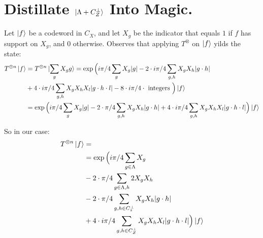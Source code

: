 \documentclass[manuscript,screen,review]{acmart}
\begin{document}
    \section{Distillate $\ket{\Lambda + C_{Z}^{\perp}}$ Into Magic.}
Let $\ket{f}$ be a codeword in $C_{X}$, and let $X_{g}$ be the indicator that equals $1$ if $f$ has support on $X_{g}$, and $0$ otherwise. Observes that applying $T^{\otimes}$ on $\ket{f}$ yilds the state: 
\begin{equation*}
  \begin{split}
    T^{\otimes n}\ket{f} & =  T^{\otimes n}\ket{\sum_{g} X_{g}g } = \exp \Big( i\pi/4 \sum_{g} X_{g}|g|  -  2 \cdot i \pi/4 \sum_{g,h} X_{g}X_{h}|g\cdot h| \\
    & +  4 \cdot i\pi/4 \sum_{g,h} X_{g}X_{h}X_{l}|g\cdot h \cdot l| -   8  \cdot i\pi/4 \cdot \text{ integers } \Big) \ket{f} \\
    & = \exp \Big( i\pi/4 \sum_{g} X_{g}|g|  -  2 \cdot \pi/4 \sum_{g,h} X_{g}X_{h}|g\cdot h| +  4 \cdot i\pi/4 \sum_{g,h} X_{g}X_{h}X_{l}|g\cdot h \cdot l| \Big) \ket{f}
  \end{split}
\end{equation*}

So in our case: 
\begin{equation*}
  \begin{split}
    T^{\otimes n}\ket{f} & = \\
    & = \exp \Big( i\pi/4 \sum_{g \in \Lambda } X_{g}  \\
    & -  2 \cdot \pi/4 \sum_{g \in \Lambda ,h} 2 X_{g}X_{h}  \\
    & -  2 \cdot \pi/4 \sum_{g ,h \in C_{z}^{\perp}} X_{g}X_{h}|g\cdot h| \\
   \ifdefined\MORECALC & +  \cancel{4 \cdot i\pi/4 \sum_{g \in \Lambda ,h} X_{g}X_{h}X_{l}2} \\ \fi
    & +  4 \cdot i\pi/4 \sum_{g,h \in C_{Z}^{\perp}} X_{g}X_{h}X_{l}|g\cdot h \cdot l|  \Big) \ket{f}
  \end{split}
\end{equation*}
\end{document}

